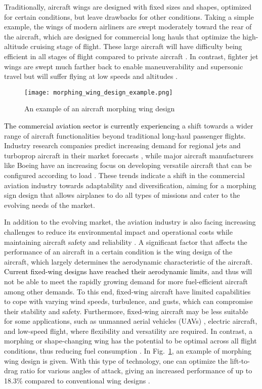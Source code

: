 \documentclass[letterpaper, journal, twoside]{IEEEtran}
\newcommand{\revision}[1]{\textcolor{black}{ #1}}
\begin{document}
Traditionally, aircraft wings are designed with fixed sizes and shapes, optimized for certain conditions, but leave drawbacks for other conditions. Taking a simple example, the wings of modern airliners are swept moderately toward the rear of the aircraft, which are designed for commercial long hauls that optimize the high-altitude cruising stage of flight. These large aircraft will have difficulty being efficient in all stages of flight compared to private aircraft \cite{gorn2021high}. In contrast, fighter jet wings are swept much farther back to enable maneuverability and supersonic travel but will suffer flying at low speeds and altitudes \cite{gorn2021high}. 

\begin{figure}[t!]
    \centering
    \texttt{[image: morphing\_wing\_design\_example.png]}
    \caption{An example of an aircraft morphing wing design~\cite{choi2017idea}}
    \label{fig:morphing_wing_design_example}
\end{figure}


\revision{The commercial aviation sector is currently experiencing} a shift towards a wider range of aircraft functionalities beyond traditional long-haul passenger flights. Industry research companies predict increasing demand for regional jets and turboprop aircraft in their market forecasts \cite{frost2022global}, while major aircraft manufacturers like Boeing have an increasing focus on developing versatile aircraft that can be configured according to load \cite{boeing2015c40}. These trends indicate a shift in the commercial aviation industry towards adaptability and diversification, aiming for a morphing sign design that allows airplanes to do all types of missions \cite{milstein2007shape} and cater to the evolving needs of the market. 

In addition to the evolving market, the aviation industry is also facing increasing challenges to reduce its environmental impact and operational costs while maintaining aircraft safety and reliability \cite{merlin2020green}. A significant factor that affects the performance of an aircraft in a certain condition is the wing design of the aircraft, which largely determines the aerodynamic characteristic of the aircraft. \revision{Current fixed-wing designs have reached their aerodynamic limits}, and thus will not be able to meet the rapidly growing demand for more fuel-efficient aircraft among other demands. To this end, fixed-wing aircraft have limited capabilities to cope with varying wind speeds, turbulence, and gusts, which can compromise their stability and safety. Furthermore, fixed-wing aircraft may be less suitable for some applications, such as unmanned aerial vehicles (UAVs) \cite{ling2019aerial}, electric aircraft, and low-speed flight, where flexibility and versatility are required. In contrast, a morphing or shape-changing wing has the potential to be optimal across all flight conditions, thus reducing fuel consumption \cite{choi2017idea}. In Fig.~\ref{fig:morphing_wing_design_example}, an example of morphing wing design is given. With this type of technology, one can optimize the lift-to-drag ratio for various angles of attack, giving an increased performance of up to 18.3\% compared to conventional wing designs \cite{ninian2017design}. 
\end{document}
